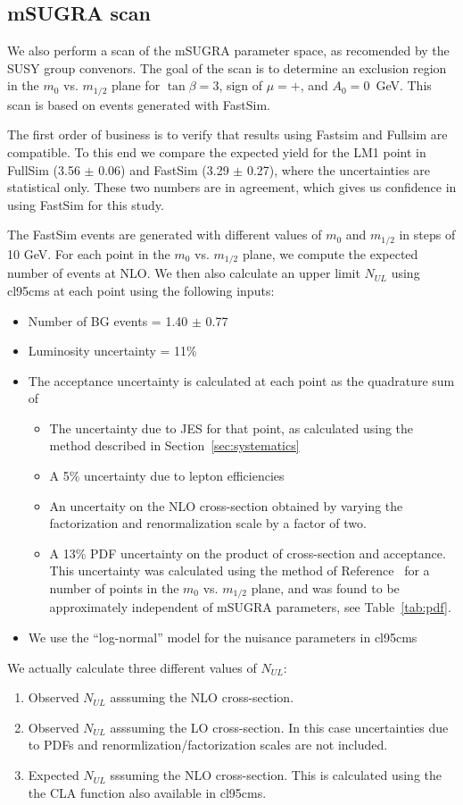 \subsection{mSUGRA scan}
\label{sec:mSUGRA}
We also perform a scan of the mSUGRA parameter space, as recomended
by the SUSY group convenors\cite{ref:scan}.
The goal of the scan is to determine an exclusion region in the 
$m_0$ vs. $m_{1/2}$ plane for
$\tan\beta=3$, 
sign of $\mu = +$, and $A_{0}=0$~GeV.  This scan is based on events
generated with FastSim.

The first order of business is to verify that results using
Fastsim and Fullsim are compatible.  To this end we compare the
expected yield for the LM1 point in FullSim (3.56 $\pm$ 0.06) and
FastSim (3.29 $\pm$ 0.27), where the uncertainties are statistical only.
These two numbers are in agreement, which gives us confidence in
using FastSim for this study.

The FastSim events are generated with different values of $m_0$
and $m_{1/2}$ in steps of 10 GeV.  For each point in the 
$m_0$ vs. $m_{1/2}$ plane, we compute the expected number of
events at NLO.  We then also calculate an upper limit $N_{UL}$
using cl95cms at each point using the following inputs:
\begin{itemize} 
\item Number of BG events = 1.40 $\pm$ 0.77
\item Luminosity uncertainty = 11\%
\item The acceptance uncertainty is calculated at each point
as the quadrature sum of
\begin{itemize}
\item The uncertainty due to JES for that point, as calculated 
using the method described in Section~\ref{sec:systematics}
\item A 5\% uncertainty due to lepton efficiencies
\item An uncertaity on the NLO cross-section obtained by varying the 
factorization and renormalization scale by a factor of two\cite{ref:sanjay}. 
\item A 13\% PDF uncertainty on the product of cross-section and acceptance.
This uncertainty was calculated using the method of Reference~\cite{ref:pdf} for a
number of points in the $m_0$ vs. $m_{1/2}$ plane, and was found to be 
approximately independent of mSUGRA parameters, see Table~\ref{tab:pdf}.
\end{itemize}
\item We use the ``log-normal'' model for the nuisance parameters
in cl95cms
\end{itemize}
We actually calculate three different values of $N_{UL}$:
\begin{enumerate}
\item Observed $N_{UL}$ asssuming the NLO cross-section.
\item Observed $N_{UL}$ asssuming the LO cross-section. In this case 
uncertainties due to PDFs and renormlization/factorization scales are not 
included.
\item Expected $N_{UL}$ sssuming the NLO cross-section.  This is 
calculated using the the CLA function also available in cl95cms.
\end{enumerate}

